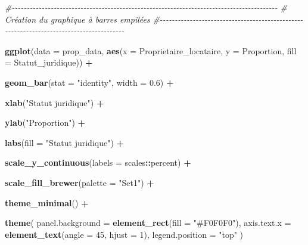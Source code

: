 \documentclass[
]{article}
\newenvironment{Shaded}{\begin{snugshade}}{\end{snugshade}}
\newcommand{\AttributeTok}[1]{\textcolor[rgb]{0.13,0.29,0.53}{#1}}
\newcommand{\CommentTok}[1]{\textcolor[rgb]{0.56,0.35,0.01}{\textit{#1}}}
\newcommand{\DecValTok}[1]{\textcolor[rgb]{0.00,0.00,0.81}{#1}}
\newcommand{\FloatTok}[1]{\textcolor[rgb]{0.00,0.00,0.81}{#1}}
\newcommand{\FunctionTok}[1]{\textcolor[rgb]{0.13,0.29,0.53}{\textbf{#1}}}
\newcommand{\NormalTok}[1]{#1}
\newcommand{\SpecialCharTok}[1]{\textcolor[rgb]{0.81,0.36,0.00}{\textbf{#1}}}
\newcommand{\StringTok}[1]{\textcolor[rgb]{0.31,0.60,0.02}{#1}}
\begin{document}
\begin{Shaded}
\begin{Highlighting}[]
\CommentTok{\#{-}{-}{-}{-}{-}{-}{-}{-}{-}{-}{-}{-}{-}{-}{-}{-}{-}{-}{-}{-}{-}{-}{-}{-}{-}{-}{-}{-}{-}{-}{-}{-}{-}{-}{-}{-}{-}{-}{-}{-}{-}{-}{-}{-}{-}{-}{-}{-}{-}{-}{-}{-}{-}{-}{-}{-}{-}{-}{-}{-}{-}{-}{-}{-}{-}{-}{-}{-}{-}{-}{-}{-}{-}{-}{-}{-}{-}{-}{-}{-}{-}{-}{-}{-}{-}{-}{-}{-}{-}}
\CommentTok{\# Création du graphique à barres empilées}
\CommentTok{\#{-}{-}{-}{-}{-}{-}{-}{-}{-}{-}{-}{-}{-}{-}{-}{-}{-}{-}{-}{-}{-}{-}{-}{-}{-}{-}{-}{-}{-}{-}{-}{-}{-}{-}{-}{-}{-}{-}{-}{-}{-}{-}{-}{-}{-}{-}{-}{-}{-}{-}{-}{-}{-}{-}{-}{-}{-}{-}{-}{-}{-}{-}{-}{-}{-}{-}{-}{-}{-}{-}{-}{-}{-}{-}{-}{-}{-}{-}{-}{-}{-}{-}{-}{-}{-}{-}{-}{-}}

\FunctionTok{ggplot}\NormalTok{(}\AttributeTok{data =}\NormalTok{ prop\_data, }\FunctionTok{aes}\NormalTok{(}\AttributeTok{x =}\NormalTok{ Proprietaire\_locataire, }\AttributeTok{y =}\NormalTok{ Proportion, }\AttributeTok{fill =}\NormalTok{ Statut\_juridique)) }\SpecialCharTok{+}
  
  \FunctionTok{geom\_bar}\NormalTok{(}\AttributeTok{stat =} \StringTok{"identity"}\NormalTok{, }\AttributeTok{width =} \FloatTok{0.6}\NormalTok{) }\SpecialCharTok{+}
  
  \FunctionTok{xlab}\NormalTok{(}\StringTok{"Statut juridique"}\NormalTok{) }\SpecialCharTok{+}
  
  \FunctionTok{ylab}\NormalTok{(}\StringTok{"Proportion"}\NormalTok{) }\SpecialCharTok{+}
  
  \FunctionTok{labs}\NormalTok{(}\AttributeTok{fill =} \StringTok{"Statut juridique"}\NormalTok{) }\SpecialCharTok{+}
  
  \FunctionTok{scale\_y\_continuous}\NormalTok{(}\AttributeTok{labels =}\NormalTok{ scales}\SpecialCharTok{::}\NormalTok{percent) }\SpecialCharTok{+}
  
  \FunctionTok{scale\_fill\_brewer}\NormalTok{(}\AttributeTok{palette =} \StringTok{"Set1"}\NormalTok{) }\SpecialCharTok{+}

  \FunctionTok{theme\_minimal}\NormalTok{() }\SpecialCharTok{+}
  
  \FunctionTok{theme}\NormalTok{(}
    \AttributeTok{panel.background =} \FunctionTok{element\_rect}\NormalTok{(}\AttributeTok{fill =} \StringTok{"\#F0F0F0"}\NormalTok{),}
    \AttributeTok{axis.text.x =} \FunctionTok{element\_text}\NormalTok{(}\AttributeTok{angle =} \DecValTok{45}\NormalTok{, }\AttributeTok{hjust =} \DecValTok{1}\NormalTok{),}
    \AttributeTok{legend.position =} \StringTok{"top"}
\NormalTok{  )}
\end{Highlighting}
\end{Shaded}
\end{document}

